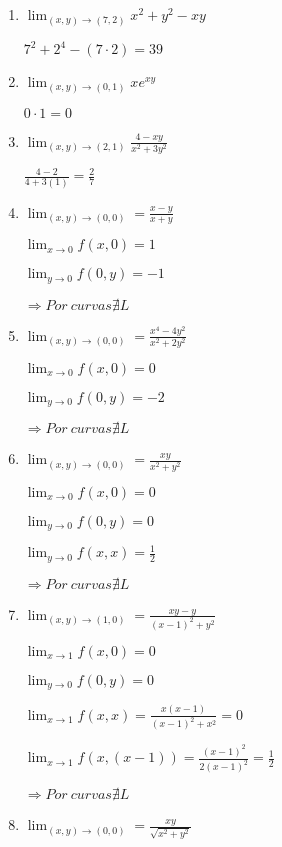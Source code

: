 \documentclass[../practica_03.tex]{subfiles}
\begin{document}
    \begin{enumerate}
        \item $\lim_{(x,y)\to(7,2)} x^2+y^2-xy$

            $7^2+2^4-(7\cdot 2) = 39$

        \item $\lim_{(x,y)\to(0,1)} xe^{xy}$

            $0\cdot 1 = 0$

        \item $\lim_{(x,y)\to(2,1)} \frac{4-xy}{x^2+3y^2}$

            $\frac{4-2}{4+3(1)} = \frac{2}{7}$

        \item $\lim_{(x,y)\to(0,0)} = \frac{x-y}{x+y}$
        
            $\lim_{x\to0} f(x,0) = 1 $

            $\lim_{y\to0} f(0,y) = -1 $

            $\Rightarrow Por\ curvas \nexists L$

        \item $\lim_{(x,y)\to(0,0)} = \frac{x^4-4y^2}{x^2+2y^2}$

            $\lim_{x\to0} f(x,0) = 0 $

            $\lim_{y\to0} f(0,y) = -2 $

            $\Rightarrow Por\ curvas \nexists L$

        \item $\lim_{(x,y)\to(0,0)} = \frac{xy}{x^2+y^2}$

            $\lim_{x\to0} f(x,0) = 0 $

            $\lim_{y\to0} f(0,y) = 0 $

            $\lim_{y\to0} f(x,x) = \frac{1}{2} $

            $\Rightarrow Por\ curvas \nexists L$

        \item $\lim_{(x,y)\to(1,0)} = \frac{xy-y}{(x-1)^2+y^2}$

            $\lim_{x\to1} f(x,0) = 0 $

            $\lim_{y\to0} f(0,y) = 0 $

            $\lim_{x\to1} f(x,x) = \frac{x(x-1)}{(x-1)^2 + x^2} = 0 $

            $\lim_{x\to1} f(x,(x-1)) = \frac{(x-1)^2}{2(x-1)^2} = \frac{1}{2} $

            $\Rightarrow Por\ curvas \nexists L$

        \item $\lim_{(x,y)\to(0,0)} = \frac{xy}{\sqrt{x^2+y^2}}$


\end{enumerate}
\end{document}
